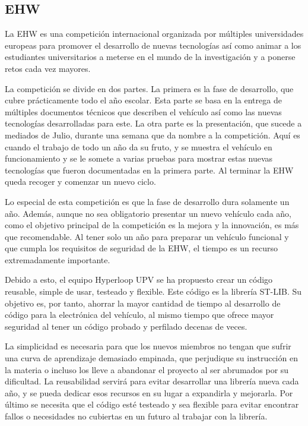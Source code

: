 \documentclass{report}
\begin{document}
\subsection{EHW}
La EHW es una competición internacional organizada por múltiples universidades europeas para promover el desarrollo de nuevas tecnologías así como animar a los estudiantes universitarios a meterse en el mundo de la investigación y a ponerse retos cada vez mayores. \par
La competición se divide en dos partes. La primera es la fase de desarrollo, que cubre prácticamente todo el año escolar. Esta parte se basa en la entrega de múltiples documentos técnicos que describen el vehículo así como las nuevas tecnologías desarrolladas para este. La otra parte es la presentación, que sucede a mediados de Julio, durante una semana que da nombre a la competición. Aquí es cuando el trabajo de todo un año da su fruto, y se muestra el vehículo en funcionamiento y se le somete a varias pruebas para mostrar estas nuevas tecnologías que fueron documentadas en la primera parte. Al terminar la EHW queda recoger y comenzar un nuevo ciclo. \par \vspace{0.3 cm}
Lo especial de esta competición es que la fase de desarrollo dura solamente un año. Además, aunque no sea obligatorio presentar un nuevo vehículo cada año, como el objetivo principal de la competición es la mejora y la innovación, es más que recomendable. Al tener solo un año para preparar un vehículo funcional y que cumpla los requisitos de seguridad de la EHW, el tiempo es un recurso extremadamente importante. \par \vspace{0.3 cm}
Debido a esto, el equipo Hyperloop UPV se ha propuesto crear un código reusable, simple de usar, testeado y flexible. Este código es la librería ST-LIB. Su objetivo es, por tanto, ahorrar la mayor cantidad de tiempo al desarrollo de código para la electrónica del vehículo, al mismo tiempo que ofrece mayor seguridad al tener un código probado y perfilado decenas de veces. \par
La {simplicidad} es necesaria para que los nuevos miembros no tengan que sufrir una curva de aprendizaje demasiado empinada, que perjudique su instrucción en la materia o incluso los lleve a abandonar el proyecto al ser abrumados por su dificultad. La {reusabilidad} servirá para evitar desarrollar una librería nueva cada año, y se pueda dedicar esos recursos en su lugar a expandirla y mejorarla. Por último se necesita que el código esté {testeado} y sea {flexible} para evitar encontrar fallos o necesidades no cubiertas en un futuro al trabajar con la librería. 
\end{document}

